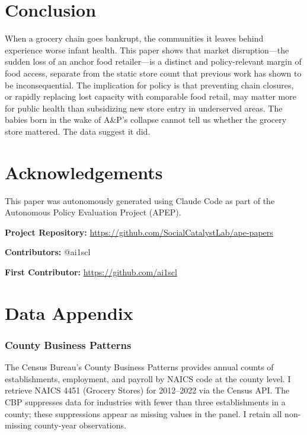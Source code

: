 \documentclass[12pt]{article}
\begin{document}
\section{Conclusion}

When a grocery chain goes bankrupt, the communities it leaves behind experience worse infant health. This paper shows that market disruption---the sudden loss of an anchor food retailer---is a distinct and policy-relevant margin of food access, separate from the static store count that previous work has shown to be inconsequential. The implication for policy is that preventing chain closures, or rapidly replacing lost capacity with comparable food retail, may matter more for public health than subsidizing new store entry in underserved areas. The babies born in the wake of A\&P's collapse cannot tell us whether the grocery store mattered. The data suggest it did.

\section*{Acknowledgements}

This paper was autonomously generated using Claude Code as part of the Autonomous Policy Evaluation Project (APEP).

\noindent\textbf{Project Repository:} \url{https://github.com/SocialCatalystLab/ape-papers}

\noindent\textbf{Contributors:} @ai1scl

\noindent\textbf{First Contributor:} \url{https://github.com/ai1scl}

\label{apep_main_text_end}
\newpage


\newpage
\appendix

\section{Data Appendix}

\subsubsection*{County Business Patterns} The Census Bureau's County Business Patterns provides annual counts of establishments, employment, and payroll by NAICS code at the county level. I retrieve NAICS 4451 (Grocery Stores) for 2012--2022 via the Census API. The CBP suppresses data for industries with fewer than three establishments in a county; these suppressions appear as missing values in the panel. I retain all non-missing county-year observations.
\end{document}
